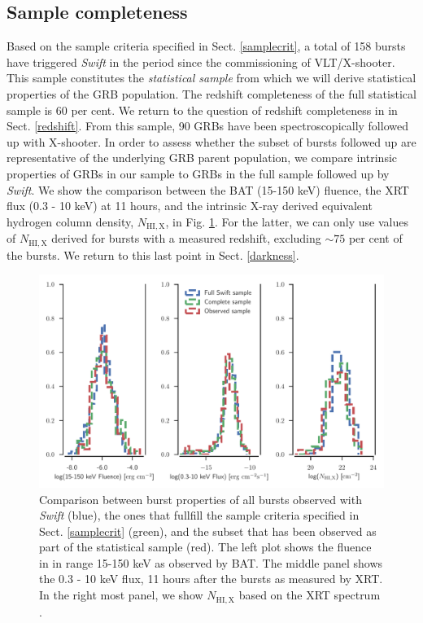 \documentclass{aa}    %
\begin{document}
\subsection{Sample completeness} \label{completeness}

Based on the sample criteria specified in Sect. \ref{samplecrit}, a total of 158
bursts have triggered \textit{Swift} in the period since the commissioning of
VLT/X-shooter. This sample constitutes the \textit{statistical sample} from
which we will derive statistical properties of the GRB population. The redshift
completeness of the full statistical sample is 60 per cent. We return to the
question of redshift completeness in in Sect. \ref{redshift}. From this sample,
90 GRBs have been spectroscopically followed up with X-shooter. In order to
assess whether the subset of bursts followed up are representative of the
underlying GRB parent population, we compare intrinsic properties of GRBs in our
sample to GRBs in the full sample followed up by \textit{Swift}. We show the
comparison between the BAT (15-150 keV) fluence, the XRT flux (0.3 - 10 keV) at
11 hours, and the intrinsic X-ray derived equivalent hydrogen column density,
$N_{\mathrm{HI,X}}$, in Fig. \ref{fig:swift_complete}. For the latter, we can
only use values of $N_{\mathrm{HI,X}}$ derived for bursts with a measured
redshift, excluding $\sim 75$ per cent of the bursts. We return to this last
point in Sect. \ref{darkness}.


\begin{figure}
	\centerline{\includegraphics[width=18cm]{figures/completeness_BAT.pdf}}
\caption{Comparison between burst properties of all bursts observed with
	\textit{Swift} (blue), the ones that fullfill the sample criteria specified in
	Sect. \ref{samplecrit} (green), and the subset that has been observed as part of
	the statistical sample (red). The left plot shows the fluence in in range 15-150
	keV as observed by BAT. The middle panel shows the 0.3 - 10 keV flux, 11 hours
	after the bursts as measured by XRT. In the right most panel, we show
	$N_{\mathrm{HI,X}}$ based on the XRT spectrum \citep{Evans2009}.}
\label{fig:swift_complete}
\end{figure}
\end{document}
